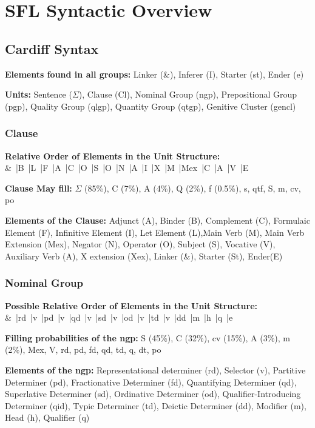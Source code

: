 \chapter{SFL Syntactic Overview}
\label{ch:syntax-overview}

\section{Cardiff Syntax}
\noindent\textbf{Elements found in all groups:} Linker (\&), Inferer (I), Starter (st), Ender (e)

\noindent\textbf{Units:} Sentence ($\Sigma$), Clause (Cl), Nominal Group (ngp), Prepositional Group (pgp), Quality Group (qlgp), Quantity Group (qtgp), Genitive Cluster (gencl)

\subsection{Clause}

\textbf{Relative Order of Elements in the Unit Structure:}\\ \noindent
\&~|B~|L~|F~|A~|C~|O~|S~|O~|N~|A~|I~|X~|M~|Mex~|C~|A~|V~|E

\noindent\textbf{Clause May fill:}
$\Sigma$ (85\%), C (7\%), A (4\%), Q (2\%), f (0.5\%), s, qtf, S, m, cv, po

\noindent\textbf{Elements of the Clause:}
Adjunct (A), Binder (B), Complement (C), Formulaic Element (F), Infinitive Element (I), Let Element (L),Main Verb (M), Main Verb Extension (Mex), Negator (N), Operator (O), Subject (S), Vocative (V), Auxiliary Verb (A), X extension (Xex), Linker (\&), Starter (St), Ender(E)

\subsection{Nominal Group}
\textbf{Possible Relative Order of Elements in the Unit Structure:} \\ \noindent
\&~|rd~|v~|pd~|v~|qd~|v~|sd~|v~|od~|v~|td~|v~|dd~|m~|h~|q~|e

\noindent\textbf{Filling probabilities of the ngp:} S (45\%), C (32\%), cv (15\%), A (3\%), m (2\%), Mex, V, rd, pd, fd, qd, td, q, dt, po

\noindent\textbf{Elements of the ngp:} Representational determiner (rd), Selector (v), Partitive Determiner (pd), Fractionative Determiner (fd), Quantifying Determiner (qd), Superlative Determiner (sd), Ordinative Determiner (od), Qualifier-Introducing Determiner (qid), Typic Determiner (td), Deictic Determiner (dd), Modifier (m), Head (h), Qualifier (q)

